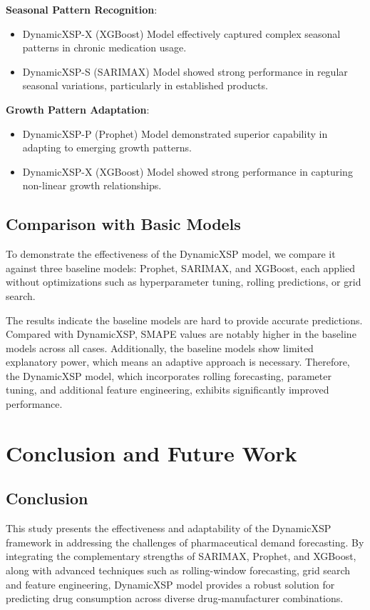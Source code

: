 \documentclass[journal]{IEEEtran}
\begin{document}
\textbf{Seasonal Pattern Recognition}:
\begin{itemize}
\item DynamicXSP-X (XGBoost) Model effectively captured complex seasonal patterns in chronic medication usage.
\item DynamicXSP-S (SARIMAX) Model showed strong performance in regular seasonal variations, particularly in established products.
\end{itemize}

\textbf{Growth Pattern Adaptation}:
\begin{itemize}
\item DynamicXSP-P (Prophet) Model demonstrated superior capability in adapting to emerging growth patterns.
\item DynamicXSP-X (XGBoost) Model showed strong performance in capturing non-linear growth relationships.
\end{itemize}

\subsection{Comparison with Basic Models}

To demonstrate the effectiveness of the DynamicXSP model, we compare it against three baseline models: Prophet, SARIMAX, and XGBoost, each applied without optimizations such as hyperparameter tuning, rolling predictions, or grid search.

The results indicate the baseline models are hard to provide accurate predictions. Compared with DynamicXSP, SMAPE values are notably higher in the baseline models across all cases. Additionally, the baseline models show limited explanatory power, which means an adaptive approach is necessary. Therefore, the DynamicXSP model, which incorporates rolling forecasting, parameter tuning, and additional feature engineering, exhibits significantly improved performance. 

\section{Conclusion and Future Work}

\subsection{Conclusion}

This study presents the effectiveness and adaptability of the DynamicXSP framework in addressing the challenges of pharmaceutical demand forecasting. By integrating the complementary strengths of SARIMAX, Prophet, and XGBoost, along with advanced techniques such as rolling-window forecasting, grid search and feature engineering, DynamicXSP model provides a robust solution for predicting drug consumption across diverse drug-manufacturer combinations.
\end{document}
